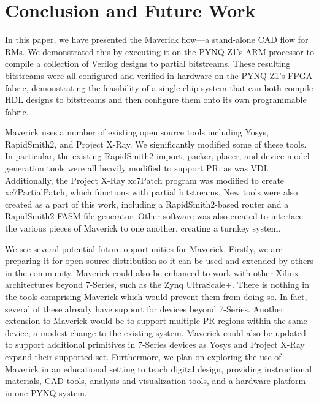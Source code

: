 \section{Conclusion and Future Work}
\label{sec:conclusion}

In this paper, we have presented the Maverick flow---a stand-alone CAD flow for RMs.
We demonstrated this by executing it on the PYNQ-Z1's ARM processor to compile a collection of Verilog designs to partial bitstreams.
These resulting bitstreams were all configured and verified in hardware on the PYNQ-Z1's FPGA fabric, demonstrating the feasibility of a single-chip system that can both compile HDL designs to bitstreams and then configure them onto its own programmable fabric.

Maverick uses a number of existing open source tools including Yosys, RapidSmith2, and Project X-Ray.  
We significantly modified some of these tools.
In particular, the existing RapidSmith2 import, packer, placer, and device model generation tools were all heavily modified to support PR, as was VDI.
Additionally, the Project X-Ray xc7Patch program was modified to create xc7PartialPatch, which functions with partial bitstreams.
New tools were also created as a part of this work, including a RapidSmith2-based router and a RapidSmith2 FASM file generator.
Other software was also created to interface the various pieces of Maverick to one another, creating a turnkey system.

We see several potential future opportunities for Maverick.
Firstly, we are preparing it for open source distribution so it can be used and extended by others in the community.
Maverick could also be enhanced to work with other Xilinx architectures beyond 7-Series, such as the Zynq UltraScale+.
There is nothing in the tools comprising Maverick which would prevent them from doing so.
In fact, several of these already have support for devices beyond 7-Series.
Another extension to Maverick would be to support multiple PR regions within the same device, a modest change to the existing system.
Maverick could also be updated to support additional primitives in 7-Series devices as Yosys and Project X-Ray expand their supported set.
Furthermore, we plan on exploring the use of Maverick in an educational setting to teach digital design, providing instructional materials, CAD tools, analysis and visualization tools, and a hardware platform in one PYNQ system.
